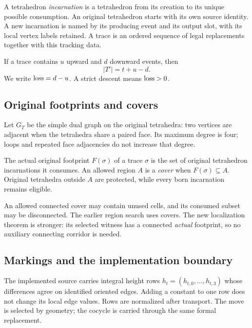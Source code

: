 \begin{definition}
A tetrahedron \emph{incarnation} is a tetrahedron from its creation to its
unique possible consumption. An original tetrahedron starts with its own
source identity. A new incarnation is named by its producing event and its
output slot, with its local vertex labels retained. A trace is an ordered
sequence of legal replacements together with this tracking data.
\end{definition}

If a trace contains $u$ upward and $d$ downward events, then
\begin{equation}\label{eq:balance}
 |T'|=t+u-d.
\end{equation}
We write $\operatorname{loss}=d-u$. A strict descent means $\operatorname{loss}>0$.

\subsection{Original footprints and covers}

Let $G_T$ be the simple dual graph on the original tetrahedra: two vertices
are adjacent when the tetrahedra share a paired face. Its maximum degree
is four; loops and repeated face adjacencies do not increase that degree.

\begin{definition}
The actual original footprint $F(\sigma)$ of a trace $\sigma$ is the set of
original tetrahedron incarnations it consumes. An allowed region $A$ is a
\emph{cover} when $F(\sigma)\subseteq A$. Original tetrahedra outside $A$
are protected, while every born incarnation remains eligible.
\end{definition}

An allowed connected cover may contain unused cells, and its consumed subset
may be disconnected. The earlier region search uses covers. The new
localization theorem is stronger: its selected witness has a connected
\emph{actual} footprint, so no auxiliary connecting corridor is needed.

\subsection{Markings and the implementation boundary}

The implemented source carries integral height rows
$h_t=(h_{t,0},\ldots,h_{t,3})$ whose differences agree on identified oriented
edges. Adding a constant to one row does not change its local edge values.
Rows are normalized after transport. The move is selected by geometry; the
cocycle is carried through the same formal replacement.

